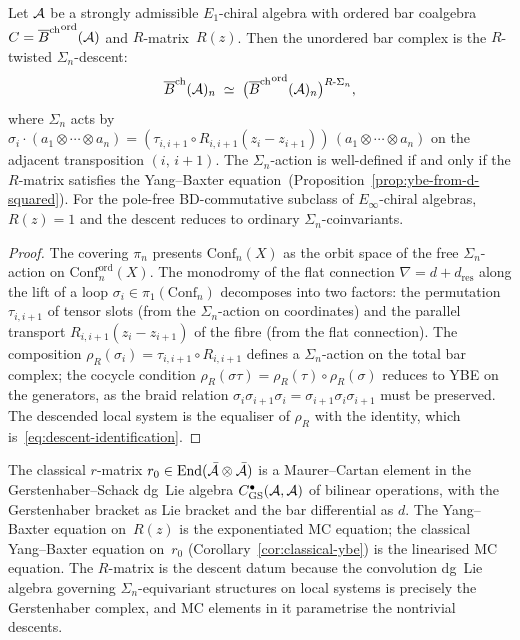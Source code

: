 \begin{proposition}
Let $\mathcal{A}$ be a strongly admissible $E_1$-chiral algebra with
ordered bar coalgebra $C={\overline{B}^{\mathrm{ch}}}^{\mathrm{ord}}(\mathcal{A})$ and
$R$-matrix~$R(z)$. Then the unordered bar complex is the
$R$-twisted $\Sigma_n$-descent:
\begin{equation}%
\Barch(\cA)_n
\;\simeq\;
\bigl({\Barch}^{\mathrm{ord}}(\cA)_n\bigr)^{R\text{-}\Sigma_n},
\end{equation}
where $\Sigma_n$ acts by $\sigma_i\cdot(a_1\otimes\cdots\otimes a_n)
=(\tau_{i,i+1}\circ R_{i,i+1}(z_i{-}z_{i+1}))\,
(a_1\otimes\cdots\otimes a_n)$
on the adjacent transposition $(i,\,i{+}1)$. The
$\Sigma_n$-action is well-defined if and only if the
$R$-matrix satisfies the Yang--Baxter
equation~\textup{(Proposition~\ref{prop:ybe-from-d-squared})}.
For the pole-free BD-commutative subclass of
$E_\infty$-chiral algebras, $R(z)=1$ and the descent reduces to
ordinary $\Sigma_n$-coinvariants.
\end{proposition}

\begin{proof}
The covering $\pi_n$ presents $\mathrm{Conf}_n(X)$ as the
orbit space of the free $\Sigma_n$-action on
$\mathrm{Conf}_n^{\mathrm{ord}}(X)$. The monodromy of the
flat connection $\nabla=d+d_{\mathrm{res}}$ along the lift of a
loop $\sigma_i\in\pi_1(\mathrm{Conf}_n)$ decomposes into two
factors: the permutation $\tau_{i,i+1}$ of tensor slots
(from the $\Sigma_n$-action on coordinates) and the
parallel transport $R_{i,i+1}(z_i-z_{i+1})$ of the fibre
(from the flat connection). The composition
$\rho_R(\sigma_i)=\tau_{i,i+1}\circ R_{i,i+1}$ defines a
$\Sigma_n$-action on the total bar complex; the
cocycle condition $\rho_R(\sigma\tau)
=\rho_R(\tau)\circ\rho_R(\sigma)$ reduces to YBE on the
generators, as the braid relation
$\sigma_i\sigma_{i+1}\sigma_i
=\sigma_{i+1}\sigma_i\sigma_{i+1}$ must be preserved.
The descended local system is the equaliser of $\rho_R$
with the identity, which is~\eqref{eq:descent-identification}.
\end{proof}

\begin{remark}
The classical $r$-matrix
$r_0\in\operatorname{End}(\bar{\mathcal{A}}\otimes\bar{\mathcal{A}})$ is a
Maurer--Cartan element in the Gerstenhaber--Schack dg~Lie
algebra $C^\bullet_{\mathrm{GS}}(\mathcal{A},\mathcal{A})$ of bilinear
operations, with the Gerstenhaber bracket as Lie bracket
and the bar differential as $d$. The Yang--Baxter equation
on~$R(z)$ is the exponentiated MC equation; the
classical Yang--Baxter equation on~$r_0$
(Corollary~\ref{cor:classical-ybe}) is the linearised MC
equation. The $R$-matrix is the descent datum because the
convolution dg~Lie algebra governing $\Sigma_n$-equivariant
structures on local systems is precisely the Gerstenhaber
complex, and MC elements in it parametrise the nontrivial
descents.
\end{remark}

